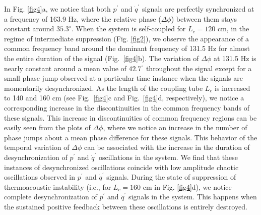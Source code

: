 \documentclass[%
preprint,
 amsmath,amssymb,
 aps,
 pra,
]{revtex4-2}
\begin{document}
In Fig. \ref{fig4}a, we notice that both $p^{\prime}$ and $\dot{q}^{\prime}$ signals are perfectly synchronized at a frequency of 163.9 Hz, where the relative phase ($\Delta\phi$) between them stays constant around $35.3^\circ$. When the system is self-coupled for $L_c = 120$ cm, in the regime of intermediate suppression (Fig. \ref{fig2}), we observe the appearance of a common frequency band around the dominant frequency of 131.5 Hz for almost the entire duration of the signal (Fig.~\ref{fig4}b). The variation of $\Delta\phi$ at 131.5 Hz is nearly constant around a mean value of $42.7^\circ$ throughout the signal except for a small phase jump observed at a particular time instance when the signals are momentarily desynchronized. As the length of the coupling tube $L_c$ is increased to 140 and 160 cm (see Fig.~\ref{fig4}c and Fig.~\ref{fig4}d, respectively), we notice a corresponding increase in the discontinuities in the common frequency bands of these signals. This increase in discontinuities of common frequency regions can be easily seen from the plots of $\Delta\phi$, where we notice an increase in the number of phase jumps about a mean phase difference for these signals. This behavior of the temporal variation of $\Delta\phi$ can be associated with the increase in the duration of desynchronization of $p^{\prime}$ and $\dot{q}^{\prime}$ oscillations in the system. We find that these instances of desynchronized oscillations coincide with low amplitude chaotic oscillations observed in $p^{\prime}$ and $\dot{q}^{\prime}$ signals. During the state of suppression of thermoacoustic instability (i.e., for $L_c = 160$ cm in Fig. \ref{fig4}d), we notice complete desynchronization of $p^{\prime}$ and $\dot{q}^{\prime}$ signals in the system. This happens when the sustained positive feedback between these oscillations is entirely destroyed. 
\end{document}
